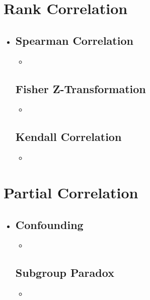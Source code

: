 \section{Rank Correlation}
\begin{itemize}
  \item []
  
  \subsection{Spearman Correlation}
  \begin{itemize}
    \item 
  \end{itemize}

  \subsection{Fisher Z-Transformation}
  \begin{itemize}
    \item 
  \end{itemize}

  \subsection{Kendall Correlation}
  \begin{itemize}
    \item 
  \end{itemize}

\end{itemize}

\section{Partial Correlation}
\begin{itemize}
  \item[]

  \subsection{Confounding}
  \begin{itemize}
    \item 
  \end{itemize}

  \subsection{Subgroup Paradox}
  \begin{itemize}
    \item 
  \end{itemize}
  
\end{itemize}
